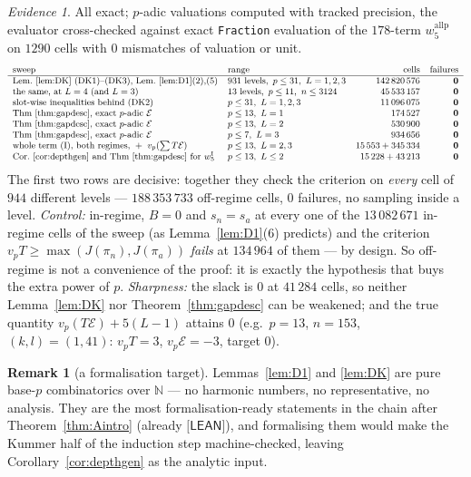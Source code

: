 \documentclass[11pt,reqno]{amsart}
\theoremstyle{plain}
\theoremstyle{definition}
\newtheorem{remark}[theorem]{Remark}
\theoremstyle{remark}
\newtheorem{evidence}[theorem]{Evidence}
\numberwithin{equation}{section}
\newcommand{\NN}{\mathbb{N}}
\newcommand{\Ecal}{\mathcal{E}}
\newcommand{\LEAN}{\textsf{[LEAN]}}
\begin{document}
\begin{evidence}\label{ev:DK}
All exact; $p$-adic valuations computed with tracked precision, the evaluator cross-checked
against exact \texttt{Fraction} evaluation of the $178$-term $w_5^{\mathrm{allp}}$ on $1290$
cells with $0$ mismatches of valuation or unit.
\[
\small
\begin{array}{llrr}
\text{sweep} & \text{range} & \text{cells} & \text{failures}\\\hline
\text{Lem.~\ref{lem:DK} (DK1)--(DK3), Lem.~\ref{lem:D1}(2),(5)}
 & 931\text{ levels},\ p\le31,\ L=1,2,3 & 142\,820\,576 & \mathbf 0\\
\text{the same, at } L=4\ (\text{and }L=3) & 13\text{ levels},\ p\le11,\ n\le3124 & 45\,533\,157 & \mathbf 0\\
\text{slot-wise inequalities behind (DK2)} & p\le31,\ L=1,2,3 & 11\,096\,075 & \mathbf 0\\
\text{Thm~\ref{thm:gapdesc}, exact }p\text{-adic }\Ecal & p\le13,\ L=1 & 174\,527 & \mathbf 0\\
\text{Thm~\ref{thm:gapdesc}, exact }p\text{-adic }\Ecal & p\le13,\ L=2 & 530\,900 & \mathbf 0\\
\text{Thm~\ref{thm:gapdesc}, exact }p\text{-adic }\Ecal & p\le7,\ L=3 & 934\,656 & \mathbf 0\\
\text{whole term (I), both regimes, }+\ v_p(\sum T\Ecal) & p\le13,\ L=2,3 & 15\,553+345\,334 & \mathbf 0\\
\text{Cor.~\ref{cor:depthgen} and Thm~\ref{thm:gapdesc} for } w_5^{\mathrm I} & p\le13,\ L\le2 & 15\,228+43\,213 & \mathbf 0
\end{array}
\]
The first two rows are decisive: together they check the criterion on \emph{every} cell of $944$
different levels --- $188\,353\,733$ off-regime cells, $0$ failures, no sampling inside a level.
\emph{Control:} in-regime, $B=0$ and $s_n=s_a$ at every one of the $13\,082\,671$ in-regime
cells of the sweep (as Lemma~\ref{lem:D1}(6) predicts) and the criterion
$v_pT\ge\max(J(\pi_n),J(\pi_a))$ \emph{fails} at $134\,964$ of them --- by design. So
off-regime is not a convenience of the proof: it is exactly the hypothesis that buys the extra
power of $p$. \emph{Sharpness:} the slack is $0$ at $41\,284$ cells, so neither
Lemma~\ref{lem:DK} nor Theorem~\ref{thm:gapdesc} can be weakened; and the true quantity
$v_p(T\Ecal)+5(L-1)$ attains $0$ (e.g.\ $p=13$, $n=153$, $(k,l)=(1,41)$: $v_pT=3$,
$v_p\Ecal=-3$, target $0$).
\end{evidence}

\begin{remark}[a formalisation target]
Lemmas~\ref{lem:D1} and \ref{lem:DK} are pure base-$p$ combinatorics over $\NN$ --- no harmonic
numbers, no representative, no analysis. They are the most formalisation-ready statements in
the chain after Theorem~\ref{thm:Aintro} (already $\LEAN$), and formalising them would make the
Kummer half of the induction step machine-checked, leaving Corollary~\ref{cor:depthgen} as the
analytic input.
\end{remark}
\end{document}
